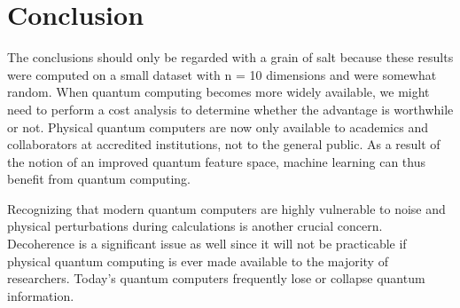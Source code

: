 \documentclass[10pt,journal,compsoc]{IEEEtran}
\begin{document}




\section{Conclusion}
The conclusions should only be regarded with a grain of salt because these results were computed on a small dataset with n = 10 dimensions and were somewhat random.
When quantum computing becomes more widely available, we might need to perform a cost analysis to determine whether the advantage is worthwhile or not. Physical quantum computers are now only available to academics and collaborators at accredited institutions, not to the general public.
As a result of the notion of an improved quantum feature space, machine learning can thus benefit from quantum computing.

\quad Recognizing that modern quantum computers are highly vulnerable to noise and physical perturbations during calculations is another crucial concern. Decoherence is a significant issue as well since it will not be practicable if physical quantum computing is ever made available to the majority of researchers. Today's quantum computers frequently lose or collapse quantum information.


%
\end{document}
